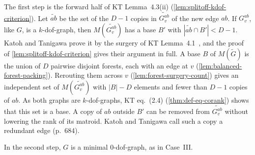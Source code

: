 The first step is the forward half of KT Lemma~4.3(ii)
(\cref{lem:splitoff-kdof-criterion}). Let $\widetilde{ab}$ be the set
of the $D - 1$ copies in $\widetilde{G_v^{ab}}$ of the new edge $ab$.
If $G_v^{ab}$, like $G$, is a $k$-dof-graph, then
$M(\widetilde{G_v^{ab}})$ has a base $B'$ with
$|\widetilde{ab} \cap B'| < D - 1$. Katoh and Tanigawa prove it by the
surgery of KT Lemma~4.1~\cite[p.~661]{katohTanigawa2011}, and the proof
of \cref{lem:splitoff-kdof-criterion} gives their argument in full. A
base $B$ of $M(\tilde G)$ is the union of $D$ pairwise disjoint forests,
each with an edge at $v$ (\cref{lem:balanced-forest-packing}).
Rerouting them across $v$ (\cref{lem:forest-surgery-count}) gives an
independent set of $M(\widetilde{G_v^{ab}})$ with $|B| - D$ elements
and fewer than $D - 1$ copies of $ab$. As both graphs are
$k$-dof-graphs, KT eq.~(2.4) (\cref{thm:def-eq-corank}) shows that
this set is a base. A copy of $ab$ outside $B'$ can be removed from
$\widetilde{G_v^{ab}}$ without lowering the rank of its matroid. Katoh
and Tanigawa call such a copy a redundant edge (p.~684).

In the second step, $G$ is a minimal $0$-dof-graph, as in Case~III.

